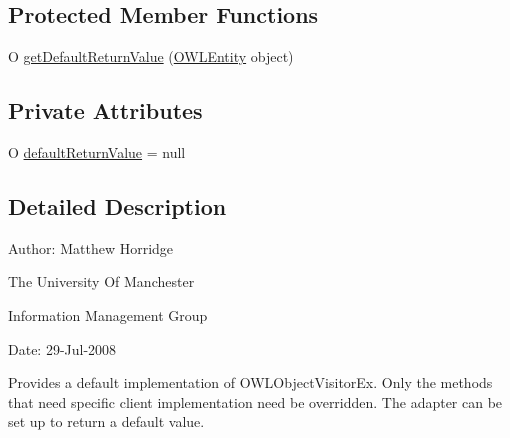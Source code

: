 \subsection*{Protected Member Functions}
\begin{DoxyCompactItemize}
\item 
O \hyperlink{classorg_1_1semanticweb_1_1owlapi_1_1util_1_1_o_w_l_entity_visitor_ex_adapter_3_01_o_01_4_a96429793ba14d6b87e5373d8d47c485a}{get\-Default\-Return\-Value} (\hyperlink{interfaceorg_1_1semanticweb_1_1owlapi_1_1model_1_1_o_w_l_entity}{O\-W\-L\-Entity} object)
\end{DoxyCompactItemize}
\subsection*{Private Attributes}
\begin{DoxyCompactItemize}
\item 
O \hyperlink{classorg_1_1semanticweb_1_1owlapi_1_1util_1_1_o_w_l_entity_visitor_ex_adapter_3_01_o_01_4_ab6f951a9b5122724746424fe40365584}{default\-Return\-Value} = null
\end{DoxyCompactItemize}


\subsection{Detailed Description}
Author\-: Matthew Horridge\par
 The University Of Manchester\par
 Information Management Group\par
 Date\-: 29-\/\-Jul-\/2008\par
\par


Provides a default implementation of {\ttfamily O\-W\-L\-Object\-Visitor\-Ex}. Only the methods that need specific client implementation need be overridden. The adapter can be set up to return a default value. 

